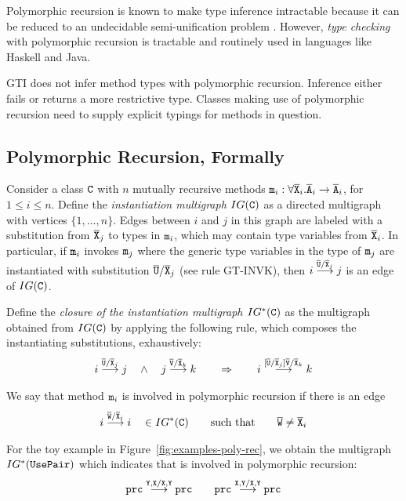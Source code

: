 Polymorphic recursion is known to make type inference intractable
\cite{DBLP:journals/toplas/Henglein93,DBLP:journals/toplas/KfouryTU93}
because it can be reduced to an undecidable semi-unification problem
\cite{DBLP:journals/iandc/KfouryTU93}. However, \emph{type checking} with
polymorphic recursion is tractable and routinely used in languages like Haskell
and Java.

GTI does not infer method types with polymorphic recursion. Inference either fails or
returns a more restrictive type. Classes making use of polymorphic recursion need to supply
explicit typings for methods in question. 


\subsection{Polymorphic Recursion, Formally}
\label{sec:polym-recurs-form}

Consider a class ${\tt C}$ with $n$ mutually recursive methods ${\tt m}_i :
\forall\overline{\tt X}_i. \overline{\tt A}_i \to \overline{\tt A}_i$, for $1\le i\le n$. Define the \emph{instantiation
  multigraph $IG({\tt C})$} as a directed multigraph with vertices $\{1,
\dots, n\}$.
Edges between $i$ and $j$ in this graph are labeled with a
substitution from $\overline{\tt X}_j$ to types in ${\tt m}_i$, which may contain
type variables from $\overline{\tt X}_i$.
In particular, if ${\tt m}_i$ invokes ${\tt m}_j$ where the generic type variables in
the type of ${\tt m}_j$ are instantiated with substitution
$\overline{\tt U}/\overline{\tt X}_j$ (see rule GT-INVK), then 
$
i \stackrel{\overline{\tt U}/\overline{\tt X}_j}{\longrightarrow} j
$
is an edge of $IG ({\tt C})$.

Define the \emph{closure of the instantiation multigraph $IG^*({\tt C})$} as the multigraph
obtained from $IG({\tt C})$ by applying the following rule, which
composes the instantiating substitutions, exhaustively:
\begin{gather}\label{eq:1}
  i \stackrel{\overline{\tt U}/\overline{\tt X}_j}{\longrightarrow} j
  \quad\wedge\quad
  j \stackrel{\overline{\tt V}/\overline{\tt X}_k}{\longrightarrow} k
  \qquad\Rightarrow\qquad
  i \stackrel{[\overline{\tt U}/\overline{\tt X}_j]\overline{\tt V}/\overline{\tt X}_k}{\longrightarrow} k
\end{gather}

\begin{definition}
  We say that method ${\tt m}_i$ is involved in polymorphic recursion
  if there is an edge
  \begin{gather}\label{eq:2}
    i \stackrel{\overline{\tt W}/\overline{\tt X}_i}{\longrightarrow} i \quad \in IG^*
    ({\tt C}) \qquad \text{such that} \qquad \overline{\tt W} \ne \overline{\tt X}_i
  \end{gather}
\end{definition}
For the toy example in Figure~\ref{fig:examples-poly-rec}, we obtain
the multigraph $IG^* ({\tt UsePair})$ which indicates that  is
involved in polymorphic recursion:
\begin{gather*}
  {\tt prc} \stackrel{{\tt Y,X}/{\tt X,Y}}{\longrightarrow} {\tt prc}
  \qquad
  {\tt prc} \stackrel{{\tt X,Y}/{\tt X,Y}}{\longrightarrow} {\tt prc}
\end{gather*}

